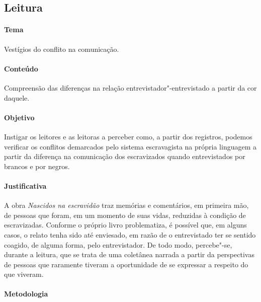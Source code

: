 \documentclass[11pt]{extarticle}
\begin{document}
\subsection{Leitura}


\paragraph{Tema} Vestígios do conflito na comunicação.


\paragraph{Conteúdo} Compreensão das diferenças na relação entrevistador"-entrevistado
a partir da cor daquele.


\paragraph{Objetivo} Instigar os leitores e as leitoras a perceber como, a partir dos registros,
podemos verificar os conflitos demarcados pelo sistema escravagista na própria linguagem a partir
da diferença na comunicação dos escravizados quando entrevistados por brancos e por negros.

\paragraph{Justificativa} A obra \emph{Nascidos na escravidão} traz memórias e
comentários, em primeira mão, de pessoas que foram, em um momento de
suas vidas, reduzidas à condição de escravizadas. Conforme o próprio
livro problematiza, é possível que, em alguns casos, o relato tenha sido
até enviesado, em razão de o entrevistado ter se sentido coagido, de
alguma forma, pelo entrevistador. De todo modo, percebe"-se, durante a
leitura, que se trata de uma coletânea narrada a partir da perspectivas
de pessoas que raramente tiveram a oportunidade de se expressar a
respeito do que viveram.


\paragraph{Metodologia}
\end{document}
